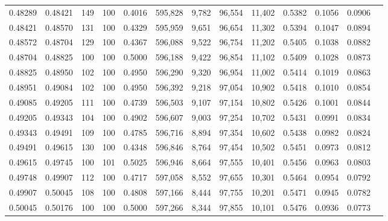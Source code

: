 \begin{tabular}{rrrrrrrrrrrrr}
0.48289 & 0.48421 &   149 & 100 &                                     0.4016 & 595,828 &   9,782 &  96,554 &  11,402 & 0.5382 & 0.1056 & 0.0906 \\
0.48421 & 0.48570 &   131 & 100 &                                     0.4329 & 595,959 &   9,651 &  96,654 &  11,302 & 0.5394 & 0.1047 & 0.0894 \\
0.48572 & 0.48704 &   129 & 100 &                                     0.4367 & 596,088 &   9,522 &  96,754 &  11,202 & 0.5405 & 0.1038 & 0.0882 \\
0.48704 & 0.48825 &   100 & 100 &                                     0.5000 & 596,188 &   9,422 &  96,854 &  11,102 & 0.5409 & 0.1028 & 0.0873 \\
0.48825 & 0.48950 &   102 & 100 &                                     0.4950 & 596,290 &   9,320 &  96,954 &  11,002 & 0.5414 & 0.1019 & 0.0863 \\
0.48951 & 0.49084 &   102 & 100 &                                     0.4950 & 596,392 &   9,218 &  97,054 &  10,902 & 0.5418 & 0.1010 & 0.0854 \\
0.49085 & 0.49205 &   111 & 100 &                                     0.4739 & 596,503 &   9,107 &  97,154 &  10,802 & 0.5426 & 0.1001 & 0.0844 \\
0.49205 & 0.49343 &   104 & 100 &                                     0.4902 & 596,607 &   9,003 &  97,254 &  10,702 & 0.5431 & 0.0991 & 0.0834 \\
0.49343 & 0.49491 &   109 & 100 &                                     0.4785 & 596,716 &   8,894 &  97,354 &  10,602 & 0.5438 & 0.0982 & 0.0824 \\
0.49491 & 0.49615 &   130 & 100 &                                     0.4348 & 596,846 &   8,764 &  97,454 &  10,502 & 0.5451 & 0.0973 & 0.0812 \\
0.49615 & 0.49745 &   100 & 101 &                                     0.5025 & 596,946 &   8,664 &  97,555 &  10,401 & 0.5456 & 0.0963 & 0.0803 \\
0.49748 & 0.49907 &   112 & 100 &                                     0.4717 & 597,058 &   8,552 &  97,655 &  10,301 & 0.5464 & 0.0954 & 0.0792 \\
0.49907 & 0.50045 &   108 & 100 &                                     0.4808 & 597,166 &   8,444 &  97,755 &  10,201 & 0.5471 & 0.0945 & 0.0782 \\
0.50045 & 0.50176 &   100 & 100 &                                     0.5000 & 597,266 &   8,344 &  97,855 &  10,101 & 0.5476 & 0.0936 & 0.0773 \\

\end{tabular}
